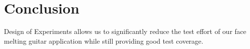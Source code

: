 \documentclass[12pt,journal]{article}
\begin{document}
\section{Conclusion}
Design of Experiments allows us to significantly reduce the test effort of our
face melting guitar application while still providing good test coverage.

\clearpage
\singlespace





\clearpage
\printbibliography
\end{document}
